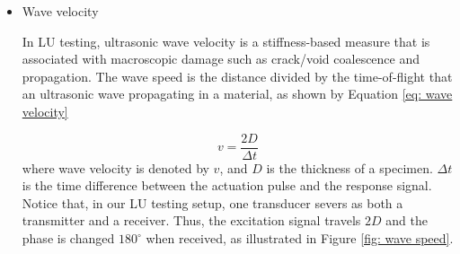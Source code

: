 \begin{itemize}
    \item Wave velocity
    
    In LU testing, ultrasonic wave velocity is a stiffness-based measure that is associated with macroscopic damage such as crack/void coalescence and propagation. The wave speed is the distance divided by the time-of-flight that an ultrasonic wave propagating in a material, as shown by Equation \eqref{eq: wave velocity}
    
    \begin{equation}
        v = \frac{2D}{\Delta t}
        \label{eq: wave velocity}
    \end{equation}
    where wave velocity is denoted by $v$, and $D$ is the thickness of a specimen. $\Delta t$ is the time difference between the actuation pulse and the response signal. Notice that, in our LU testing setup, one transducer severs as both a transmitter and a receiver. Thus, the excitation signal travels $2D$ and the phase is changed $180^{\circ} $ when received, as illustrated in Figure \ref{fig: wave speed}.


\end{itemize}
